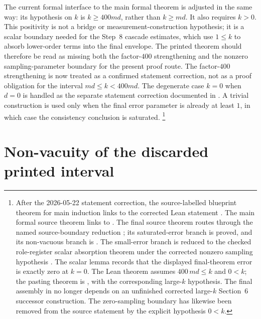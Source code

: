\documentclass[11pt]{article}
\begin{document}
The current formal interface to the main formal theorem is adjusted in the same
way: its hypothesis on \(k\) is \(k\ge 400md\), rather than \(k\ge md\).  It
also requires \(k>0\).  This positivity is not a bridge or
measurement-construction hypothesis; it is a scalar boundary needed for the
Step~8 cascade estimates, which use \(1\le k\) to absorb lower-order terms into
the final envelope.  The printed theorem should therefore be read as missing
both the factor-\(400\) strengthening and the nonzero sampling-parameter
boundary for the present proof route.  The factor-\(400\) strengthening is now
treated as a confirmed statement correction, not as a proof obligation for the
interval \(md\le k<400md\).  The degenerate case \(k=0\) when \(d=0\) is handled
as the separate statement correction documented in
.  A trivial
construction is used only when the final error parameter is already at least
\(1\), in which case the consistency conclusion is saturated.
\footnote{After the 2026-05-22 statement correction, the source-labelled
blueprint theorem for main induction links to the corrected Lean statement
.  The
main formal source theorem links to
.  The final source
theorem routes through the named source-boundary reduction
; its
saturated-error branch is proved, and its non-vacuous branch is
.  The
small-error branch is reduced to the checked role-register scalar absorption
theorem under the corrected nonzero sampling hypothesis
.
The scalar lemma  records
that the displayed final-theorem error is exactly zero at \(k=0\).
The Lean theorem  assumes
\(400\,md\le k\) and \(0<k\); the pasting theorem is
, with
the corresponding large-\(k\) hypothesis.  The final assembly in
 no longer depends on an
unfinished corrected large-\(k\) Section~6 successor construction.  The
zero-sampling boundary has likewise been removed from the source statement by
the explicit hypothesis \(0<k\).}

\section{Non-vacuity of the discarded printed interval}
\end{document}
